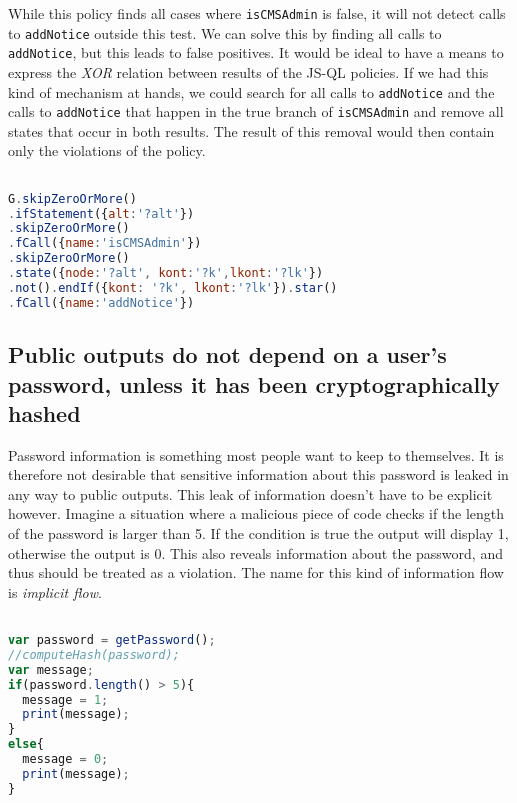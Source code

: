 While this policy finds all cases where \texttt{isCMSAdmin} is false, it will not detect calls to \texttt{addNotice} outside this test. We can solve this by finding all calls to \texttt{addNotice}, but this leads to false positives. It would be ideal to have a means to express the \textit{XOR} relation between results of the JS-QL policies. If we had this kind of mechanism at hands, we could search for all calls to \texttt{addNotice} and the calls to \texttt{addNotice} that happen in the true branch of \texttt{isCMSAdmin} and remove all states that occur in both results. The result of this removal would then contain only the violations of the policy.

\begin{lstlisting}[label={lst:Policy4JSQL},language=JavaScript,caption=Policy 4 in JS-QL]  % float=t?

G.skipZeroOrMore()
.ifStatement({alt:'?alt'})
.skipZeroOrMore()
.fCall({name:'isCMSAdmin'})
.skipZeroOrMore()
.state({node:'?alt', kont:'?k',lkont:'?lk'})
.not().endIf({kont: '?k', lkont:'?lk'}).star()
.fCall({name:'addNotice'})
\end{lstlisting}


\subsection{Public outputs do not depend on a user's password, unless it has been cryptographically hashed}

Password information is something most people want to keep to themselves. It is therefore not desirable that sensitive information about this password is leaked in any way to public outputs. This leak of information doesn't have to be explicit however. Imagine a situation where a malicious piece of code checks if the length of the password is larger than 5. If the condition is true the output will display 1, otherwise the output is 0. This also reveals information about the password, and thus should be treated as a violation. The name for this kind of information flow is \textit{implicit flow}.

\begin{lstlisting}[label={lst:PWDepends},language=JavaScript,caption=The output depends on the password example,mathescape=true]  % float=t?

var password = getPassword();
//computeHash(password);
var message;
if(password.length() > 5){
  message = 1;
  print(message);
}
else{
  message = 0;
  print(message);
}
\end{lstlisting}

